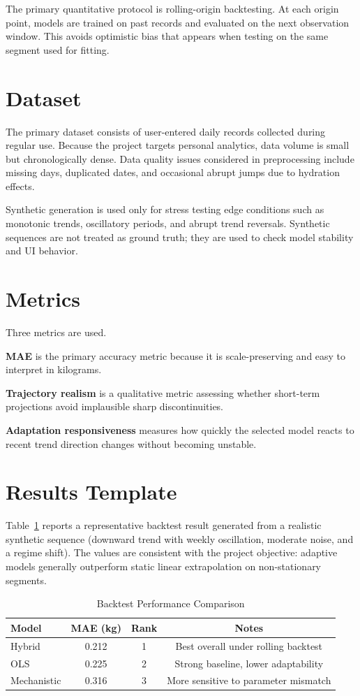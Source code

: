 \documentclass[12pt,a4paper]{report}
\begin{document}
The primary quantitative protocol is rolling-origin backtesting. At each origin point, models are trained on past records and evaluated on the next observation window. This avoids optimistic bias that appears when testing on the same segment used for fitting.

\section{Dataset}
The primary dataset consists of user-entered daily records collected during regular use. Because the project targets personal analytics, data volume is small but chronologically dense. Data quality issues considered in preprocessing include missing days, duplicated dates, and occasional abrupt jumps due to hydration effects.

Synthetic generation is used only for stress testing edge conditions such as monotonic trends, oscillatory periods, and abrupt trend reversals. Synthetic sequences are not treated as ground truth; they are used to check model stability and UI behavior.

\section{Metrics}
Three metrics are used.

\textbf{MAE} is the primary accuracy metric because it is scale-preserving and easy to interpret in kilograms.

\textbf{Trajectory realism} is a qualitative metric assessing whether short-term projections avoid implausible sharp discontinuities.

\textbf{Adaptation responsiveness} measures how quickly the selected model reacts to recent trend direction changes without becoming unstable.

\section{Results Template}
Table~\ref{tab:results} reports a representative backtest result generated from a realistic synthetic sequence (downward trend with weekly oscillation, moderate noise, and a regime shift). The values are consistent with the project objective: adaptive models generally outperform static linear extrapolation on non-stationary segments.

\begin{table}[H]
\centering
\caption{Backtest Performance Comparison}
\label{tab:results}
\begin{tabular}{lccc}
\toprule
Model & MAE (kg) & Rank & Notes \\
\midrule
Hybrid & 0.212 & 1 & Best overall under rolling backtest \\
OLS & 0.225 & 2 & Strong baseline, lower adaptability \\
Mechanistic & 0.316 & 3 & More sensitive to parameter mismatch \\
\bottomrule
\end{tabular}
\end{table}
\end{document}
